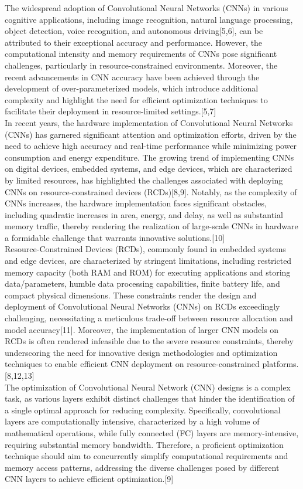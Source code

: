 The widespread adoption of Convolutional Neural Networks (CNNs) in various cognitive applications, including image recognition, natural language processing, object detection, voice recognition, and autonomous driving[5,6], can be attributed to their exceptional accuracy and performance. However, the computational intensity and memory requirements of CNNs pose significant challenges, particularly in resource-constrained environments. Moreover, the recent advancements in CNN accuracy have been achieved through the development of over-parameterized models, which introduce additional complexity and highlight the need for efficient optimization techniques to facilitate their deployment in resource-limited settings.[5,7]\\
In recent years, the hardware implementation of Convolutional Neural Networks (CNNs) has garnered significant attention and optimization efforts, driven by the need to achieve high accuracy and real-time performance while minimizing power consumption and energy expenditure. The growing trend of implementing CNNs on digital devices, embedded systems, and edge devices, which are characterized by limited resources, has highlighted the challenges associated with deploying CNNs on resource-constrained devices (RCDs)[8,9]. Notably, as the complexity of CNNs increases, the hardware implementation faces significant obstacles, including quadratic increases in area, energy, and delay, as well as substantial memory traffic, thereby rendering the realization of large-scale CNNs in hardware a formidable challenge that warrants innovative solutions.[10]\\
Resource-Constrained Devices (RCDs), commonly found in embedded systems and edge devices, are characterized by stringent limitations, including restricted memory capacity (both RAM and ROM) for executing applications and storing data/parameters, humble data processing capabilities, finite battery life, and compact physical dimensions. These constraints render the design and deployment of Convolutional Neural Networks (CNNs) on RCDs exceedingly challenging, necessitating a meticulous trade-off between resource allocation and model accuracy[11]. Moreover, the implementation of larger CNN models on RCDs is often rendered infeasible due to the severe resource constraints, thereby underscoring the need for innovative design methodologies and optimization techniques to enable efficient CNN deployment on resource-constrained platforms.[8,12,13]\\
The optimization of Convolutional Neural Network (CNN) designs is a complex task, as various layers exhibit distinct challenges that hinder the identification of a single optimal approach for reducing complexity. Specifically, convolutional layers are computationally intensive, characterized by a high volume of mathematical operations, while fully connected (FC) layers are memory-intensive, requiring substantial memory bandwidth. Therefore, a proficient optimization technique should aim to concurrently simplify computational requirements and memory access patterns, addressing the diverse challenges posed by different CNN layers to achieve efficient optimization.[9]\\
